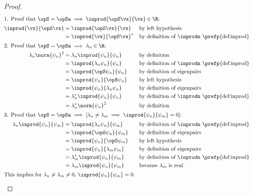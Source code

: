 \begin{proof}
  \begin{align*}
    \intertext{1. Proof that $\opS=\opSa  \implies  \inprod{\opS\vx}{\vx}\in\R$:}
    \inprod{\vx}{\opS\vx}
      &= \inprod{\opS\vx}{\vx}
      && \text{by left hypothesis}
    \\&= \inprod{\vx}{\opS\vx}^\ast
      && \text{by definition of $\inprodn$ \prefp{def:inprod}}
    \\
    \intertext{2. Proof that $\opS=\opSa \implies \lambda_n \in \R $:}
    \lambda_n\norm{\psi_n}^2
      &= \lambda_n \inprod{\psi_n}{\psi_n}
      && \text{by definition}
    \\&= \inprod{\lambda_n \psi_n}{\psi_n}
      && \text{by definition of $\inprodn$ \prefp{def:inprod}}
    \\&= \inprod{\opS \psi_n}{\psi_n}
      && \text{by definition of eigenpairs}
    \\&= \inprod{\psi_n}{\opS \psi_n}
      && \text{by left hypothesis}
    \\&= \inprod{\psi_n}{\lambda_n \psi_n}
      && \text{by definition of eigenpairs}
    \\&= \lambda_n^\ast \inprod{\psi_n}{\psi_n}
      && \text{by definition of $\inprodn$ \prefp{def:inprod}}
    \\&= \lambda_n^\ast \norm{\psi_n}^2
      && \text{by definition}
    \\
    \intertext{3. Proof that $\opS=\opSa \implies
     [\lambda_n\ne \lambda_m\implies\inprod{\psi_n}{\psi_m}=0]$:}
    \lambda_n\inprod{\psi_n}{\psi_m}
      &= \inprod{\lambda_n\psi_n}{\psi_m}
      && \text{by definition of $\inprodn$ \prefp{def:inprod}}
    \\&= \inprod{\opS\psi_n}{\psi_m}
      && \text{by definition of eigenpairs}
    \\&= \inprod{\psi_n}{\opS\psi_m}
      && \text{by left hypothesis}
    \\&= \inprod{\psi_n}{\lambda_m\psi_m}
      && \text{by definition of eigenpairs}
    \\&= \lambda_m^\ast\inprod{\psi_n}{\psi_m}
      && \text{by definition of $\inprodn$ \prefp{def:inprod}}
    \\&= \lambda_m\inprod{\psi_n}{\psi_m}
      && \text{because $\lambda_m$ is real}
    \\
    \intertext{This implies for $\lambda_n\ne \lambda_m\ne 0$,
               $\inprod{\psi_n}{\psi_m}=0$.}
\end{align*}
\end{proof}

